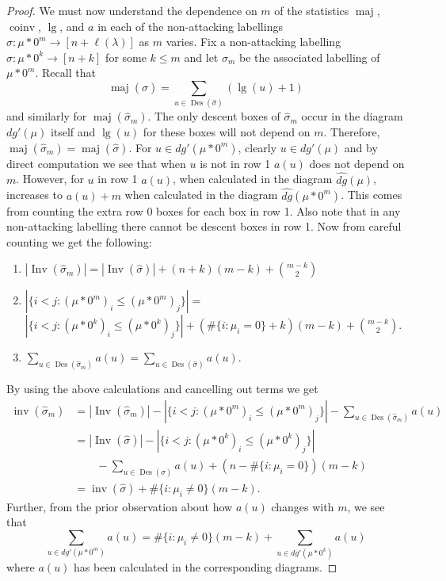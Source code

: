 \documentclass[ALCO,Unicode]{cedram}
\DeclareMathOperator{\Des}{Des}
\DeclareMathOperator{\maj}{maj}
\DeclareMathOperator{\Inv}{Inv}
\DeclareMathOperator{\inv}{inv}
\DeclareMathOperator{\coinv}{coinv}
\DeclareMathOperator{\mathleg}{lg}
\begin{document}
\begin{proof}
  We must now understand the dependence on $m$ of the statistics $\maj$, $\coinv$, $\mathleg$, and $a$ in each of the non-attacking labellings $\sigma: \mu*0^m \rightarrow [n+\ell(\lambda)]$ as $m$ varies. Fix a non-attacking labelling $\sigma: \mu * 0^k \rightarrow [n+k]$ for some $k \leq m$ and let $\sigma_m$ be the associated labelling of $\mu * 0^m$. Recall that 
  $$\maj(\widehat{\sigma}) = \sum_{u \in \Des(\widehat{\sigma})} (\mathleg(u) + 1)$$
  and similarly for $\maj(\widehat{\sigma}_m).$
  The only descent boxes of $\widehat{\sigma}_m$ occur in the diagram $dg'(\mu)$ itself and $\mathleg(u)$ for these boxes will not depend on $m$. Therefore, $\maj(\widehat{\sigma}_m) = \maj(\widehat{\sigma})$. For $u \in dg'(\mu * 0^m)$, clearly $u \in dg'(\mu)$ and by direct computation we see that when $u$ is not in row 1 $a(u)$ does not depend on $m$. However, for $u$ in row 1 $a(u)$, when calculated in the diagram $\widehat{dg}(\mu)$, increases to $a(u)+m$ when calculated in the diagram $\widehat{dg}(\mu*0^m)$. This comes from counting the extra row 0 boxes for each box in row 1. Also note that in any non-attacking labelling there cannot be descent boxes in row 1. Now from careful counting we get the following:
  \begin{enumerate}
      \item $|\Inv(\widehat{\sigma}_m)| = |\Inv(\widehat{\sigma})| + (n+k)(m-k) + \binom{m-k}{2}$ \\
      \item $|\{i<j : (\mu * 0^m)_i \leq (\mu * 0^m)_j \} | =$ \\ $| \{i<j : (\mu*0^k)_i \leq (\mu*0^k)_j \} | + (\#\{i:\mu_i = 0\} +k)(m-k) + \binom{m-k}{2}$. \\
      \item $\sum_{u \in \Des(\widehat{\sigma}_m)} a(u) = \sum_{u \in \Des(\widehat{\sigma})} a(u).$
  \end{enumerate}
By using the above calculations and cancelling out terms we get
\begin{align*}
    \inv(\widehat{\sigma}_m) &= |\Inv(\widehat{\sigma}_m)| - | \{i<j: (\mu * 0^m)_i \leq (\mu * 0^m)_j \} | - \sum_{u \in \Des(\widehat{\sigma}_m)} a(u) \\
    &= |\Inv(\widehat{\sigma})| - | \{i<j: (\mu*0^k)_i \leq (\mu*0^k)_j \} | \\
    & \qquad - \sum_{u \in \Des(\widehat{\sigma})} a(u) + (n- \#\{i:\mu_i = 0\})(m-k)\\
    &= \inv(\widehat{\sigma}) +\#\{i:\mu_i \neq 0\}(m-k).
\end{align*} 
Further, from the prior observation about how  $a(u)$ changes with $m$, we see that 
  $$\sum_{u \in dg'(\mu * 0^m)} a(u) = \#\{i:\mu_i \neq 0\}(m-k) + \sum_{u \in dg'(\mu*0^k)} a(u)$$
  where $a(u)$ has been calculated in the corresponding diagrams. 


\end{proof}
\end{document}
